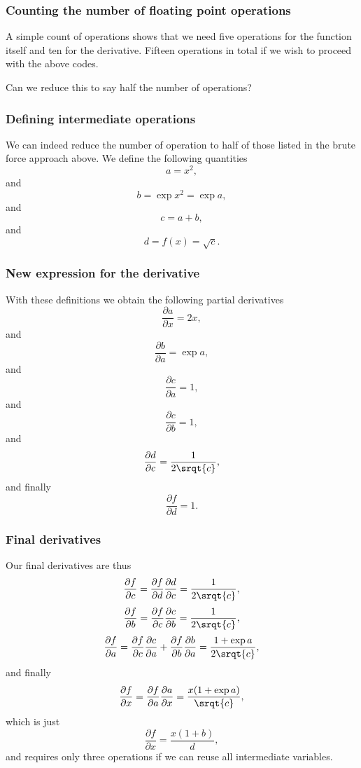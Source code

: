 \documentclass{beamer}
\begin{document}
\begin{frame}
\frametitle{Counting the number of floating point operations}

A simple count of operations shows that we need five operations for
the function itself and ten for the derivative.  Fifteen operations in total if we wish to proceed with the above codes.

Can we reduce this to
say half the number of operations?
\end{frame}

\begin{frame}
\frametitle{Defining intermediate operations}

We can indeed reduce the number of operation to half of those listed in the brute force approach above.
We define the following quantities
\[
a = x^2,
\]
and
\[
b = \exp{x^2} = \exp{a},
\]
and
\[
c= a+b,
\]
and
\[
d=f(x)=\sqrt{c}.
\]
\end{frame}

\begin{frame}
\frametitle{New expression for the derivative}

With these definitions we obtain the following partial derivatives 
\[
\frac{\partial a}{\partial x} = 2x,
\]
and
\[
\frac{\partial b}{\partial a} = \exp{a},
\]
and
\[
\frac{\partial c}{\partial a} = 1,
\]
and
\[
\frac{\partial c}{\partial b} = 1,
\]
and
\[
\frac{\partial d}{\partial c} = \frac{1}{2\srqt{c}},
\]
and finally
\[
\frac{\partial f}{\partial d} = 1.
\]
\end{frame}

\begin{frame}
\frametitle{Final derivatives}

Our final derivatives are thus
\[
\frac{\partial f}{\partial c} = \frac{\partial f}{\partial d} \frac{\partial d}{\partial c}  = \frac{1}{2\srqt{c}},
\]
\[
\frac{\partial f}{\partial b} = \frac{\partial f}{\partial c} \frac{\partial c}{\partial b}  = \frac{1}{2\srqt{c}},
\]
\[
\frac{\partial f}{\partial a} = \frac{\partial f}{\partial c} \frac{\partial c}{\partial a}+
\frac{\partial f}{\partial b} \frac{\partial b}{\partial a}  = \frac{1+\exp{a}}{2\srqt{c}},
\]
and finally 
\[
\frac{\partial f}{\partial x} = \frac{\partial f}{\partial a} \frac{\partial a}{\partial x}  = \frac{x(1+\exp{a})}{\srqt{c}},
\]
which is just
\[
\frac{\partial f}{\partial x} = \frac{x(1+b)}{d},
\]
and requires only three operations if we can reuse all intermediate variables.
\end{frame}
\end{document}
